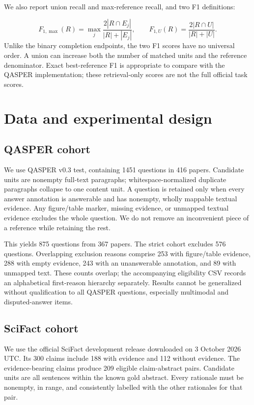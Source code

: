 \documentclass[twoside,a4paper,11pt]{article}
\begin{document}
We also report union recall and max-reference recall, and two F1 definitions:

\[
F_{1,\max}(R)=\max_j\frac{2|R\cap E_j|}{|R|+|E_j|},\qquad F_{1,U}(R)=\frac{2|R\cap U|}{|R|+|U|}.
\]
Unlike the binary completion endpoints, the two F1 scores have no universal order. A union can increase both the number of matched units and the reference denominator. Exact best-reference F1 is appropriate to compare with the QASPER implementation; these retrieval-only scores are not the full official task scores.


\section{Data and experimental design}

\subsection{QASPER cohort}
We use QASPER v0.3 test, containing 1451 questions in 416 papers. Candidate units are nonempty full-text paragraphs; whitespace-normalized duplicate paragraphs collapse to one content unit. A question is retained only when every answer annotation is answerable and has nonempty, wholly mappable textual evidence. Any figure/table marker, missing evidence, or unmapped textual evidence excludes the whole question. We do not remove an inconvenient piece of a reference while retaining the rest.

This yields 875 questions from 367 papers. The strict cohort excludes 576 questions. Overlapping exclusion reasons comprise 253 with figure/table evidence, 288 with empty evidence, 243 with an unanswerable annotation, and 89 with unmapped text. These counts overlap; the accompanying eligibility CSV records an alphabetical first-reason hierarchy separately. Results cannot be generalized without qualification to all QASPER questions, especially multimodal and disputed-answer items.


\subsection{SciFact cohort}
We use the official SciFact development release downloaded on 3 October 2026 UTC. Its 300 claims include 188 with evidence and 112 without evidence. The evidence-bearing claims produce 209 eligible claim-abstract pairs. Candidate units are all sentences within the known gold abstract. Every rationale must be nonempty, in range, and consistently labelled with the other rationales for that pair.
\end{document}
